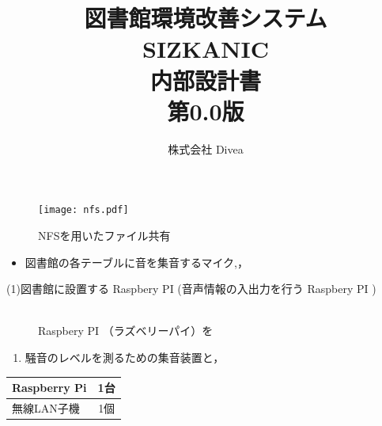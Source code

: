 \begin{figure}[h]
	\begin{center}
	\texttt{[image: nfs.pdf]}
	\caption{NFSを用いたファイル共有}
	\label{fig;db1}
	\end{center}
\end{figure}

\begin{itemize}
\item 図書館の各テーブルに音を集音するマイク,，
\end{itemize}

\begin{description}
	\item[(1)図書館に設置する Raspbery PI (音声情報の入出力を行う Raspbery PI )]\mbox{}\\
 Raspbery PI （ラズベリーパイ）を
\end{description}

\begin{enumerate}
 \item 騒音のレベルを測るための集音装置と，
\end{enumerate}

\begin{tabular}{|l|c|}
\hline
 Raspberry Pi & 1台 \\ \hline
 無線LAN子機 & 1個 \\ \hline
\end{tabular}
\fi


\documentclass[a4j,titlepage]{jarticle}
\usepackage[dvipdf]{graphicx}
\usepackage{url}
\usepackage{here}
\usepackage{ascmac}
\usepackage{amsmath}
\usepackage{color}
\title{
\vspace{30mm}
{\bf 図書館環境改善システム}
\\
\vspace{5mm}
SIZKANIC\\
\vspace{5mm}
{\bf 内部設計書}\\
\vspace{30mm}
{\bf 第0.0版}
\vspace{60mm}
}
\author{
{\large 株式会社 Divea}
}


\maketitle

\tableofcontents

